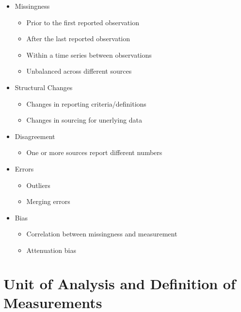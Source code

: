 \documentclass[
]{book}
\providecommand{\tightlist}{%
  \setlength{\itemsep}{0pt}\setlength{\parskip}{0pt}}
\begin{document}
\begin{itemize}
\tightlist
\item
  Missingness

  \begin{itemize}
  \tightlist
  \item
    Prior to the first reported observation
  \item
    After the last reported observation
  \item
    Within a time series between observations
  \item
    Unbalanced across different sources
  \end{itemize}
\item
  Structural Changes

  \begin{itemize}
  \tightlist
  \item
    Changes in reporting criteria/definitions
  \item
    Changes in sourcing for unerlying data
  \end{itemize}
\item
  Disagreement

  \begin{itemize}
  \tightlist
  \item
    One or more sources report different numbers
  \end{itemize}
\item
  Errors

  \begin{itemize}
  \tightlist
  \item
    Outliers
  \item
    Merging errors
  \end{itemize}
\item
  Bias

  \begin{itemize}
  \tightlist
  \item
    Correlation between missingness and measurement
  \item
    Attenuation bias
  \end{itemize}
\end{itemize}

\hypertarget{unit-of-analysis-and-definition-of-measurements}{%
\section{Unit of Analysis and Definition of Measurements}\label{unit-of-analysis-and-definition-of-measurements}}
\end{document}
